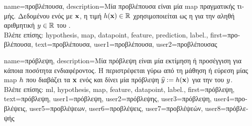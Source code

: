 {name={\foreignlanguage{greek}{προβλέπουσα}},
	description={\foreignlanguage{greek}{Μία προβλέπουσα είναι μία} \gls{map}  
		\foreignlanguage{greek}{πραγματικής τιμής. Δεδομένου ενός}  \foreignlanguage{greek}{με}  
		${\bf x}$, \foreignlanguage{greek}{η τιμή $h({\bf x}) \in \mathbb{R}$ χρησιμοποιείται ως η}  
		\foreignlanguage{greek}{για την αληθή αριθμητική}  $y \in \mathbb{R}$ \foreignlanguage{greek}{του} .\\
		\foreignlanguage{greek}{Βλέπε επίσης:} \gls{hypothesis}, \gls{map}, \gls{datapoint}, \gls{feature}, \gls{prediction}, \gls{label}.},
	first={\foreignlanguage{greek}{προβλέπουσα}},
	text={\foreignlanguage{greek}{προβλέπουσα}},
	user1={\foreignlanguage{greek}{προβλέπουσα}}, %
  	user2={\foreignlanguage{greek}{προβλέπουσας}} %
}

{name={\foreignlanguage{greek}{πρόβλεψη}},
	description={\foreignlanguage{greek}{Μία πρόβλεψη} 
		\foreignlanguage{greek}{είναι μία εκτίμηση ή προσέγγιση για κάποια ποσότητα ενδιαφέροντος. Η} 
		 \foreignlanguage{greek}{περιστρέφεται γύρω από τη μάθηση ή εύρεση μίας} \gls{map}  $h$ 
		\foreignlanguage{greek}{που διαβάζει τα}  ${\bf x}$ \foreignlanguage{greek}{ενός}  
		\foreignlanguage{greek}{και δίνει μία πρόβλεψη $\widehat{y} := h({\bf x})$ για την}  
		\foreignlanguage{greek}{του} $y$.\\
		\foreignlanguage{greek}{Βλέπε επίσης:} \gls{ml}, \gls{hypothesis}, \gls{map}, \gls{feature}, \gls{datapoint}, \gls{label}.},
	first={\foreignlanguage{greek}{πρόβλεψη}},
	text={\foreignlanguage{greek}{πρό\-βλε\-ψη}},
	user1={\foreignlanguage{greek}{πρόβλεψη}}, %
  	user2={\foreignlanguage{greek}{πρόβλεψης}}, %
	user3={\foreignlanguage{greek}{πρόβλεψη}}, %
	user4={\foreignlanguage{greek}{προβλέψεις}}, %
	user5={\foreignlanguage{greek}{προβλέψεων}}, %
	user6={\foreignlanguage{greek}{προβλέψεις}}, %
	user7={\foreignlanguage{greek}{προβλέψεών}}, %
	user8={\foreignlanguage{greek}{πρόβλεψής}} %
}

